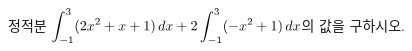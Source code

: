 정적분 $\displaystyle\int_{-1}^{3}(2x^2+x+1)\mkern3mu dx+2\int_{-1}^{3}(-x^2+1)\mkern3mu dx$의 값을 구하시오.

